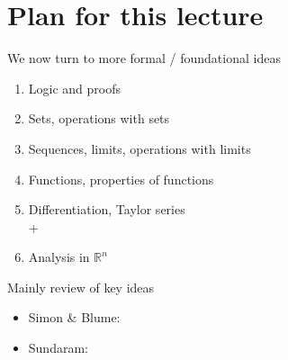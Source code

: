 \documentclass[letterpaper,10pt,english]{jupyterBook}
\begin{document}
\section{Plan for this lecture}
\label{\detokenize{03.set_theory:plan-for-this-lecture}}
\sphinxAtStartPar
We now turn to more formal / foundational ideas
\begin{enumerate}
%
\item {} 
\sphinxAtStartPar
Logic and proofs

\item {} 
\sphinxAtStartPar
Sets, operations with sets

\item {} 
\sphinxAtStartPar
Sequences, limits, operations with limits

\item {} 
\sphinxAtStartPar
Functions, properties of functions

\item {} 
\sphinxAtStartPar
Differentiation, Taylor series\\
+

\item {} 
\sphinxAtStartPar
Analysis in \(\mathbb{R}^n\)

\end{enumerate}

\sphinxAtStartPar
Mainly review of key ideas

\sphinxAtStartPar
{}
\begin{itemize}
\item {} 
\sphinxAtStartPar
Simon \& Blume:

\item {} 
\sphinxAtStartPar
Sundaram:

\end{itemize}
\end{document}
